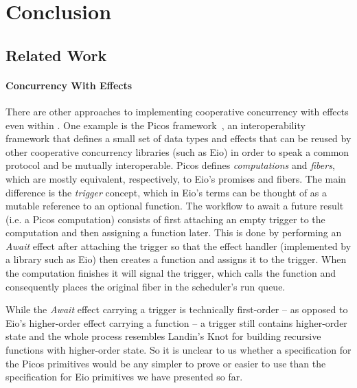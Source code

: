 \section{Conclusion}
\label{sec:conclusion}

\subsection{Related Work}
\paragraph*{Concurrency With Effects}
There are other approaches to implementing cooperative concurrency with effects even within \ocf{}.
One example is the Picos framework~\cite{Picos}, an interoperability framework that defines a small set of data types and effects that can be reused by other cooperative concurrency libraries (such as Eio)
in order to speak a common protocol and be mutually interoperable.
Picos defines \emph{computations} and \emph{fibers}, which are mostly equivalent, respectively, to Eio's promises and fibers.
The main difference is the \emph{trigger} concept, which in Eio's terms can be thought of as a mutable reference to an optional  function.
The workflow to await a future result (i.e. a Picos computation) consists of first attaching an empty trigger to the computation and then assigning a  function later.
This is done by performing an \emph{Await} effect after attaching the trigger so that the effect handler (implemented by a library such as Eio) then creates a  function and assigns it to the trigger.
When the computation finishes it will signal the trigger, which calls the  function and consequently places the original fiber in the scheduler's run queue.

While the \emph{Await} effect carrying a trigger is technically first-order -- as opposed to Eio's higher-order \esuspend{} effect carrying a  function --
a trigger still contains higher-order state and the whole process resembles Landin's Knot for building recursive functions with higher-order state.
So it is unclear to us whether a specification for the Picos primitives would be any simpler to prove or easier to use than the specification for Eio primitives we have presented so far.

